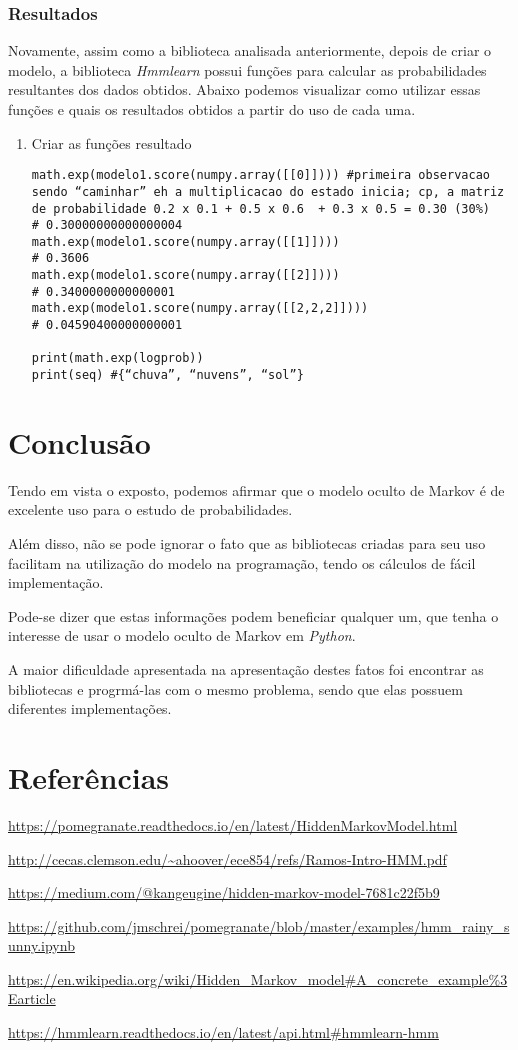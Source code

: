 \documentclass{article}
\begin{document}
\subsubsection{Resultados}
Novamente, assim como a biblioteca analisada anteriormente, depois de criar o modelo, a biblioteca \emph{Hmmlearn} possui funções para calcular as probabilidades resultantes dos dados obtidos. Abaixo podemos visualizar como utilizar essas funções e quais os resultados obtidos a partir do uso de cada uma.
\begin{enumerate}
    
\item Criar as funções resultado

\begin{verbatim}
math.exp(modelo1.score(numpy.array([[0]]))) #primeira observacao sendo “caminhar” eh a multiplicacao do estado inicia; cp, a matriz de probabilidade 0.2 x 0.1 + 0.5 x 0.6  + 0.3 x 0.5 = 0.30 (30%)
# 0.30000000000000004
math.exp(modelo1.score(numpy.array([[1]])))
# 0.3606
math.exp(modelo1.score(numpy.array([[2]])))
# 0.3400000000000001
math.exp(modelo1.score(numpy.array([[2,2,2]])))
# 0.04590400000000001

print(math.exp(logprob))
print(seq) #{“chuva”, “nuvens”, “sol”}

\end{verbatim}

\end{enumerate}
\section{Conclusão}
Tendo em vista o exposto, podemos afirmar que o modelo oculto de Markov é de excelente uso para o estudo de probabilidades. 

Além disso, não se pode ignorar o fato que as bibliotecas criadas para seu uso facilitam na utilização do modelo na programação, tendo os cálculos de fácil implementação. 

Pode-se dizer que estas informações podem beneficiar qualquer um, que tenha o interesse de usar o modelo oculto de Markov em \emph{Python}.

A maior dificuldade apresentada na apresentação destes fatos foi encontrar as bibliotecas e progrmá-las com o mesmo problema, sendo que elas possuem diferentes implementações.

\section{Referências}
\url{https://pomegranate.readthedocs.io/en/latest/HiddenMarkovModel.html}

\url{http://cecas.clemson.edu/~ahoover/ece854/refs/Ramos-Intro-HMM.pdf}

\url{https://medium.com/@kangeugine/hidden-markov-model-7681c22f5b9}

\url{https://github.com/jmschrei/pomegranate/blob/master/examples/hmm_rainy_sunny.ipynb}

\url{https://en.wikipedia.org/wiki/Hidden_Markov_model#A_concrete_example%3Earticle}

\url{https://hmmlearn.readthedocs.io/en/latest/api.html#hmmlearn-hmm}
\end{document}
